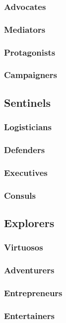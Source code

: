 \documentclass{article}
\begin{document}
\subsubsection{Advocates}
\subsubsection{Mediators}
\subsubsection{Protagonists}
\subsubsection{Campaigners}
\subsection{Sentinels}
\subsubsection{Logisticians}
\subsubsection{Defenders}
\subsubsection{Executives}
\subsubsection{Consuls}
\subsection{Explorers}
\subsubsection{Virtuosos}
\subsubsection{Adventurers}
\subsubsection{Entrepreneurs}
\subsubsection{Entertainers}
\clearpage
\end{document}
